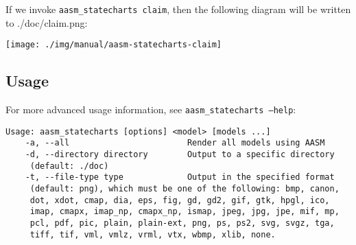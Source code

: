 \documentclass[document.tex]{subfiles}
\begin{document}
\pagebreak

If we invoke {\tt aasm\_statecharts claim}, then the following diagram will be written to ./doc/claim.png:

{\centering
 \texttt{[image: ./img/manual/aasm-statecharts-claim]}}


\subsection{Usage}

For more advanced usage information, see {\tt aasm\_statecharts --help}:

\begin{verbatim}Usage: aasm_statecharts [options] <model> [models ...]
    -a, --all                        Render all models using AASM
    -d, --directory directory        Output to a specific directory
     (default: ./doc)
    -t, --file-type type             Output in the specified format
     (default: png), which must be one of the following: bmp, canon,
     dot, xdot, cmap, dia, eps, fig, gd, gd2, gif, gtk, hpgl, ico,
     imap, cmapx, imap_np, cmapx_np, ismap, jpeg, jpg, jpe, mif, mp,
     pcl, pdf, pic, plain, plain-ext, png, ps, ps2, svg, svgz, tga,
     tiff, tif, vml, vmlz, vrml, vtx, wbmp, xlib, none.
\end{verbatim}
\end{document}
